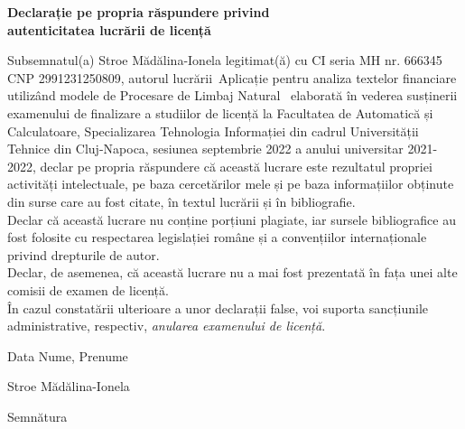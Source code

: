 \begin{center}
	{\bf Declarație pe propria răspundere privind\\ 
		autenticitatea lucrării de licență}
\end{center}
\vspace{1cm}

\begin{minipage}{\linewidth}
	\indent Subsemnatul(a) Stroe Mădălina-Ionela %
	legitimat(ă) cu CI %
	seria MH %
	nr. 666345 %
	CNP 2991231250809, %
	autorul lucrării\
	Aplicație pentru analiza textelor financiare utilizând modele de Procesare de Limbaj Natural \
	elaborată în vederea susținerii examenului de finalizare a studiilor de licență la Facultatea de Automatică și Calculatoare, Specializarea Tehnologia Informației %
	din cadrul Universității Tehnice din Cluj-Napoca, sesiunea septembrie 2022 %
	 a anului universitar 2021-2022, %
	  declar pe propria răspundere că această lucrare este rezultatul propriei activități intelectuale, pe baza cercetărilor mele și pe baza informațiilor obținute din surse care au fost citate, în textul lucrării și în bibliografie.\\
	\hspace*{8mm} Declar că această lucrare nu conține porțiuni plagiate, iar sursele bibliografice au fost folosite cu respectarea legislației române și a convențiilor internaționale privind drepturile de autor.\\
	\hspace*{8mm} Declar, de asemenea, că această lucrare nu a mai fost prezentată în fața unei alte comisii de examen de licență.\\
	\hspace*{8mm} În cazul constatării ulterioare a unor declarații false, voi suporta sancțiunile administrative, respectiv, \emph{anularea examenului de licență}.
\end{minipage}
\vspace{1.5cm}

Data \hspace{8cm} Nume, Prenume 
\vspace{0.5cm}

\hspace{8.5cm} Stroe Mădălina-Ionela

\vspace{1cm}
\hspace{9.4cm}Semnătura
\newpage
